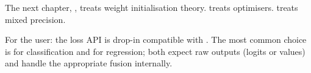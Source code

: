 The next chapter, , treats weight
initialisation theory.  treats optimisers.
 treats mixed precision.

\begin{lucidnote}
For the user: the loss API is drop-in compatible with
. The most common choice is
 for classification and
 for regression; both expect raw outputs
(logits or values) and handle the appropriate fusion internally.
\end{lucidnote}
